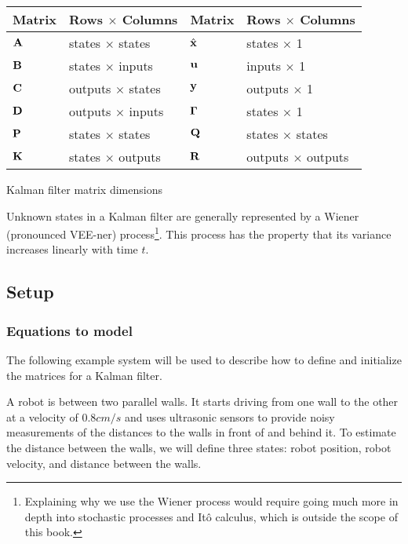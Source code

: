 \begin{booktable}
  \begin{tabular}{|ll|ll|}
    \hline
    \rowcolor{headingbg}
    \textbf{Matrix} & \textbf{Rows $\times$ Columns} &
    \textbf{Matrix} & \textbf{Rows $\times$ Columns} \\
    \hline
    $\mathbf{A}$ & states $\times$ states & $\hat{\mathbf{x}}$ & states $\times$ 1 \\
    $\mathbf{B}$ & states $\times$ inputs & $\mathbf{u}$ & inputs $\times$ 1 \\
    $\mathbf{C}$ & outputs $\times$ states & $\mathbf{y}$ & outputs $\times$ 1 \\
    $\mathbf{D}$ & outputs $\times$ inputs & $\mathbf{\Gamma}$ & states $\times$ 1 \\
    $\mathbf{P}$ & states $\times$ states & $\mathbf{Q}$ & states $\times$ states \\
    $\mathbf{K}$ & states $\times$ outputs & $\mathbf{R}$ & outputs $\times$ outputs
      \\
    \hline
  \end{tabular}
  \caption{Kalman filter matrix dimensions}
\end{booktable}

Unknown \glspl{state} in a Kalman filter are generally represented by a Wiener
(pronounced VEE-ner) process\footnote{Explaining why we use the Wiener process
would require going much more in depth into stochastic processes and It\^{o}
calculus, which is outside the scope of this book.}. This process has the
property that its variance increases linearly with time $t$.

\subsection{Setup}

\subsubsection{Equations to model}

The following example \gls{system} will be used to describe how to define and
initialize the matrices for a Kalman filter.

A robot is between two parallel walls. It starts driving from one wall to the
other at a velocity of $0.8 cm/s$ and uses ultrasonic sensors to provide noisy
measurements of the distances to the walls in front of and behind it. To
estimate the distance between the walls, we will define three \glspl{state}:
robot position, robot velocity, and distance between the walls.

